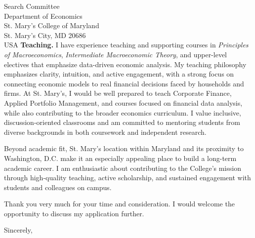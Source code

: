 \documentclass[11pt,letterpaper]{letter}
\begin{document}
\begin{letter}{Search Committee \\
Department of Economics \\
St. Mary’s College of Maryland \\
St. Mary’s City, MD 20686 \\ USA}
\textbf{Teaching.} I have experience teaching and supporting courses in \textit{Principles of Macroeconomics}, \textit{Intermediate Macroeconomic Theory}, and upper-level electives that emphasize data-driven economic analysis. My teaching philosophy emphasizes clarity, intuition, and active engagement, with a strong focus on connecting economic models to real financial decisions faced by households and firms. At St. Mary’s, I would be well prepared to teach Corporate Finance, Applied Portfolio Management, and courses focused on financial data analysis, while also contributing to the broader economics curriculum. I value inclusive, discussion-oriented classrooms and am committed to mentoring students from diverse backgrounds in both coursework and independent research.

Beyond academic fit, St. Mary’s location within Maryland and its proximity to Washington, D.C. make it an especially appealing place to build a long-term academic career. I am enthusiastic about contributing to the College’s mission through high-quality teaching, active scholarship, and sustained engagement with students and colleagues on campus.

Thank you very much for your time and consideration. I would welcome the opportunity to discuss my application further.

\closing{Sincerely,}

\end{letter}
\end{document}
